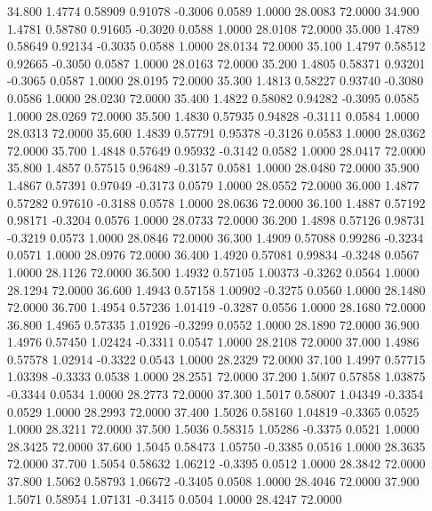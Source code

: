   34.800   1.4774   0.58909   0.91078  -0.3006   0.0589   1.0000  28.0083  72.0000
  34.900   1.4781   0.58780   0.91605  -0.3020   0.0588   1.0000  28.0108  72.0000
  35.000   1.4789   0.58649   0.92134  -0.3035   0.0588   1.0000  28.0134  72.0000
  35.100   1.4797   0.58512   0.92665  -0.3050   0.0587   1.0000  28.0163  72.0000
  35.200   1.4805   0.58371   0.93201  -0.3065   0.0587   1.0000  28.0195  72.0000
  35.300   1.4813   0.58227   0.93740  -0.3080   0.0586   1.0000  28.0230  72.0000
  35.400   1.4822   0.58082   0.94282  -0.3095   0.0585   1.0000  28.0269  72.0000
  35.500   1.4830   0.57935   0.94828  -0.3111   0.0584   1.0000  28.0313  72.0000
  35.600   1.4839   0.57791   0.95378  -0.3126   0.0583   1.0000  28.0362  72.0000
  35.700   1.4848   0.57649   0.95932  -0.3142   0.0582   1.0000  28.0417  72.0000
  35.800   1.4857   0.57515   0.96489  -0.3157   0.0581   1.0000  28.0480  72.0000
  35.900   1.4867   0.57391   0.97049  -0.3173   0.0579   1.0000  28.0552  72.0000
  36.000   1.4877   0.57282   0.97610  -0.3188   0.0578   1.0000  28.0636  72.0000
  36.100   1.4887   0.57192   0.98171  -0.3204   0.0576   1.0000  28.0733  72.0000
  36.200   1.4898   0.57126   0.98731  -0.3219   0.0573   1.0000  28.0846  72.0000
  36.300   1.4909   0.57088   0.99286  -0.3234   0.0571   1.0000  28.0976  72.0000
  36.400   1.4920   0.57081   0.99834  -0.3248   0.0567   1.0000  28.1126  72.0000
  36.500   1.4932   0.57105   1.00373  -0.3262   0.0564   1.0000  28.1294  72.0000
  36.600   1.4943   0.57158   1.00902  -0.3275   0.0560   1.0000  28.1480  72.0000
  36.700   1.4954   0.57236   1.01419  -0.3287   0.0556   1.0000  28.1680  72.0000
  36.800   1.4965   0.57335   1.01926  -0.3299   0.0552   1.0000  28.1890  72.0000
  36.900   1.4976   0.57450   1.02424  -0.3311   0.0547   1.0000  28.2108  72.0000
  37.000   1.4986   0.57578   1.02914  -0.3322   0.0543   1.0000  28.2329  72.0000
  37.100   1.4997   0.57715   1.03398  -0.3333   0.0538   1.0000  28.2551  72.0000
  37.200   1.5007   0.57858   1.03875  -0.3344   0.0534   1.0000  28.2773  72.0000
  37.300   1.5017   0.58007   1.04349  -0.3354   0.0529   1.0000  28.2993  72.0000
  37.400   1.5026   0.58160   1.04819  -0.3365   0.0525   1.0000  28.3211  72.0000
  37.500   1.5036   0.58315   1.05286  -0.3375   0.0521   1.0000  28.3425  72.0000
  37.600   1.5045   0.58473   1.05750  -0.3385   0.0516   1.0000  28.3635  72.0000
  37.700   1.5054   0.58632   1.06212  -0.3395   0.0512   1.0000  28.3842  72.0000
  37.800   1.5062   0.58793   1.06672  -0.3405   0.0508   1.0000  28.4046  72.0000
  37.900   1.5071   0.58954   1.07131  -0.3415   0.0504   1.0000  28.4247  72.0000
